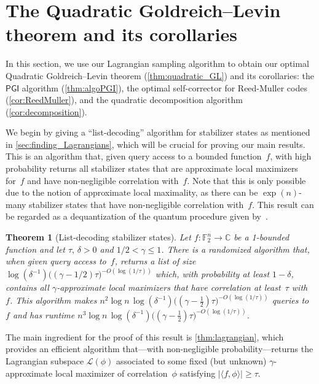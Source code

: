 \documentclass[11pt]{amsart}
\newcommand{\C}{\mathbb{C}} %
\newcommand{\F}{\mathbb{F}} %
\newcommand{\Lcal}{\mathcal{L}}
\newcommand{\PGI}{\textsf{PGI}}
\theoremstyle{plain}
\newtheorem{theorem}{Theorem}[section]
\theoremstyle{definition}
\theoremstyle{remark}
\begin{document}
\section{The Quadratic Goldreich--Levin theorem and its corollaries}
\label{sec:quadGL}

In this section, we use our Lagrangian sampling algorithm to obtain our optimal Quadratic Goldreich--Levin theorem (\cref{thm:quadratic_GL}) and its corollaries:
the $\PGI$ algorithm (\cref{thm:algoPGI}), the optimal self-corrector for Reed-Muller codes (\cref{cor:ReedMuller}), and the quadratic decomposition algorithm (\cref{cor:decomposition}).

We begin by giving a ``list-decoding'' algorithm for stabilizer states as mentioned in \cref{sec:finding_Lagrangians}, which will be crucial for proving our main results.
This is an algorithm that, given query access to a bounded function~$f$, with high probability returns all stabilizer states that are approximate local maximizers for~$f$ and have non-negligible correlation with~$f$. 
Note that this is only possible due to the notion of approximate local maximality, as there can be $\exp(n)$-many stabilizer states that have non-negligible correlation with~$f$.
This result can be regarded as a dequantization of the quantum procedure given by~\cite[Corollary~6.2]{chen2024stabilizer}.

\begin{theorem}[List-decoding stabilizer states] \label{thm:list}
    Let $f:\F_2^n \to \C$ be a 1-bounded function and let $\tau,\, \delta>0$ and $1/2<\gamma\leq 1$.
    There is a randomized algorithm that, when given query access to~$f$, returns a list of size $\log(\delta^{-1}) \big((\gamma-1/2) \tau\big)^{-O(\log(1/\tau))}$ which, with probability at least $1-\delta$, contains all $\gamma$-approximate local maximizers that have correlation at least~$\tau$ with~$f$.
    This algorithm makes $n^2 \log n\, \log(\delta^{-1}) \big((\gamma - \tfrac{1}{2}) \tau\big)^{-O(\log(1/\tau))}$ queries to~$f$ and has runtime $n^3 \log n\, \log(\delta^{-1}) \big((\gamma - \tfrac{1}{2}) \tau\big)^{-O(\log(1/\tau))}$.
\end{theorem}

The main ingredient for the proof of this result is \cref{thm:lagrangian}, which provides an efficient algorithm that---with non-negligible probability---returns the Lagrangian subspace $\Lcal(\phi)$ associated to some fixed (but unknown) $\gamma$-approximate local maximizer of correlation~$\phi$ satisfying $|\langle f, \phi\rangle| \geq \tau$.
\end{document}
